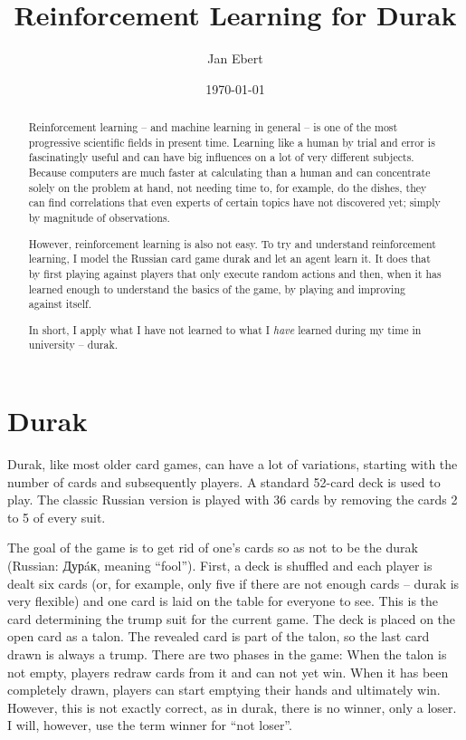 \documentclass[a4paper,titlepage]{article}
\title{Reinforcement Learning for Durak}
\author{Jan Ebert}
\date{\today}
\begin{document}
\maketitle

\begin{abstract}

Reinforcement learning -- and machine learning in general -- is one of the most progressive scientific fields in present time. Learning like a human by trial and error is fascinatingly useful and can have big influences on a lot of very different subjects. Because computers are much faster at calculating than a human and can concentrate solely on the problem at hand, not needing time to, for example, do the dishes, they can find correlations that even experts of certain topics have not discovered yet; simply by magnitude of observations.

However, reinforcement learning is also not easy. To try and understand reinforcement learning, I model the Russian card game durak and let an agent learn it. It does that by first playing against players that only execute random actions and then, when it has learned enough to understand the basics of the game, by playing and improving against itself.

In short, I apply what I have not learned to what I \emph{have} learned during my time in university -- durak.

\end{abstract}

\tableofcontents

\newpage

\section{Durak}

Durak, like most older card games, can have a lot of variations, starting with the number of cards and subsequently players. A standard 52-card deck is used to play. The classic Russian version is played with 36 cards by removing the cards 2 to 5 of every suit.

The goal of the game is to get rid of one's cards so as not to be the durak (Russian: Дурáк, meaning ``fool''). First, a deck is shuffled and each player is dealt six cards (or, for example, only five if there are not enough cards -- durak is very flexible) and one card is laid on the table for everyone to see. This is the card determining the trump suit for the current game. The deck is placed on the open card as a talon. The revealed card is part of the talon, so the last card drawn is always a trump.
There are two phases in the game: When the talon is not empty, players redraw cards from it and can not yet win. When it has been completely drawn, players can start emptying their hands and ultimately win. However, this is not exactly correct, as in durak, there is no winner, only a loser. I will, however, use the term winner for ``not loser''. \medskip
\end{document}
